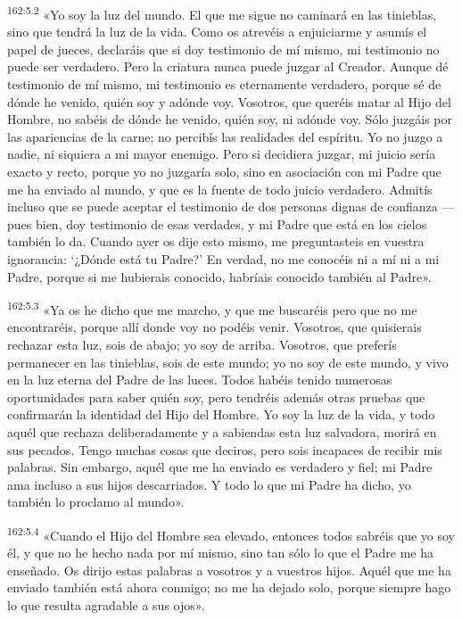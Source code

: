 \par 
\textsuperscript{162:5.2} «Yo soy la luz del mundo. El que me sigue no caminará en las tinieblas, sino que tendrá la luz de la vida. Como os atrevéis a enjuiciarme y asumís el papel de jueces, declaráis que si doy testimonio de mí mismo, mi testimonio no puede ser verdadero. Pero la criatura nunca puede juzgar al Creador. Aunque dé testimonio de mí mismo, mi testimonio es eternamente verdadero, porque sé de dónde he venido, quién soy y adónde voy. Vosotros, que queréis matar al Hijo del Hombre, no sabéis de dónde he venido, quién soy, ni adónde voy. Sólo juzgáis por las apariencias de la carne; no percibís las realidades del espíritu. Yo no juzgo a nadie, ni siquiera a mi mayor enemigo. Pero si decidiera juzgar, mi juicio sería exacto y recto, porque yo no juzgaría solo, sino en asociación con mi Padre que me ha enviado al mundo, y que es la fuente de todo juicio verdadero. Admitís incluso que se puede aceptar el testimonio de dos personas dignas de confianza ---pues bien, doy testimonio de esas verdades, y mi Padre que está en los cielos también lo da. Cuando ayer os dije esto mismo, me preguntasteis en vuestra ignorancia: `¿Dónde está tu Padre?' En verdad, no me conocéis ni a mí ni a mi Padre, porque si me hubierais conocido, habríais conocido también al Padre».

\par 
\textsuperscript{162:5.3} «Ya os he dicho que me marcho, y que me buscaréis pero que no me encontraréis, porque allí donde voy no podéis venir. Vosotros, que quisierais rechazar esta luz, sois de abajo; yo soy de arriba. Vosotros, que preferís permanecer en las tinieblas, sois de este mundo; yo no soy de este mundo, y vivo en la luz eterna del Padre de las luces. Todos habéis tenido numerosas oportunidades para saber quién soy, pero tendréis además otras pruebas que confirmarán la identidad del Hijo del Hombre. Yo soy la luz de la vida, y todo aquél que rechaza deliberadamente y a sabiendas esta luz salvadora, morirá en sus pecados. Tengo muchas cosas que deciros, pero sois incapaces de recibir mis palabras. Sin embargo, aquél que me ha enviado es verdadero y fiel; mi Padre ama incluso a sus hijos descarriados. Y todo lo que mi Padre ha dicho, yo también lo proclamo al mundo».

\par 
\textsuperscript{162:5.4} «Cuando el Hijo del Hombre sea elevado, entonces todos sabréis que yo soy él, y que no he hecho nada por mí mismo, sino tan sólo lo que el Padre me ha enseñado. Os dirijo estas palabras a vosotros y a vuestros hijos. Aquél que me ha enviado también está ahora conmigo; no me ha dejado solo, porque siempre hago lo que resulta agradable a sus ojos».

